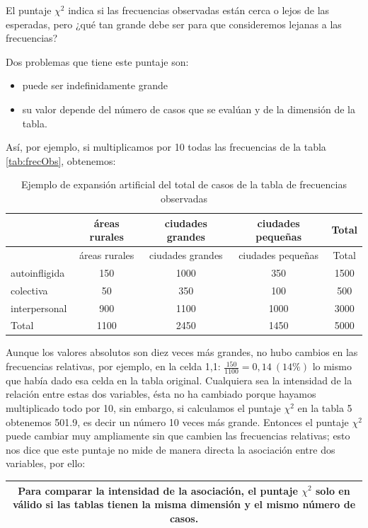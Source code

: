 \documentclass[]{book}
\providecommand{\tightlist}{%
  \setlength{\itemsep}{0pt}\setlength{\parskip}{0pt}}
\begin{document}
El puntaje \(\chi^{2}\) indica si las frecuencias observadas están cerca o lejos de las esperadas, pero ¿qué tan grande debe ser para que consideremos lejanas a las frecuencias?

Dos problemas que tiene este puntaje son:

\begin{itemize}
\tightlist
\item
  puede ser indefinidamente grande
\item
  su valor depende del número de casos que se evalúan y de la dimensión de la tabla.
\end{itemize}

Así, por ejemplo, si multiplicamos por 10 todas las frecuencias de la tabla \ref{tab:frecObs}, obtenemos:

\begin{longtable}[]{@{}lcccc@{}}
\caption{\label{tab:unnamed-chunk-158}Ejemplo de expansión artificial del total de casos de la tabla de frecuencias observadas}\tabularnewline
\toprule
& áreas rurales & ciudades grandes & ciudades pequeñas & Total\tabularnewline
\midrule
\endfirsthead
\toprule
& áreas rurales & ciudades grandes & ciudades pequeñas & Total\tabularnewline
\midrule
\endhead
autoinfligida & 150 & 1000 & 350 & 1500\tabularnewline
colectiva & 50 & 350 & 100 & 500\tabularnewline
interpersonal & 900 & 1100 & 1000 & 3000\tabularnewline
Total & 1100 & 2450 & 1450 & 5000\tabularnewline
\bottomrule
\end{longtable}

Aunque los valores absolutos son diez veces más grandes, no hubo cambios en las frecuencias relativas, por ejemplo, en la celda 1,1: \(\frac{150}{1100} = 0,14\ (14\%)\) lo mismo que había dado esa celda en la tabla original. Cualquiera sea la intensidad de la relación entre estas dos variables, ésta no ha cambiado porque hayamos multiplicado todo por 10, sin embargo, si calculamos el puntaje \(\chi^{2}\) en la tabla 5 obtenemos 501.9, es decir un número 10 veces más grande. Entonces el puntaje \(\chi^{2}\) puede cambiar muy ampliamente sin que cambien las frecuencias relativas; esto nos dice que este puntaje no mide de manera directa la asociación entre dos variables, por ello:

\begin{longtable}[]{@{}c@{}}
\toprule
\endhead
\begin{minipage}[t]{0.97\columnwidth}\centering
Para comparar la intensidad de la asociación, el puntaje \(\chi^{2}\) solo en válido si las tablas tienen la misma dimensión y el mismo número de casos.\strut
\end{minipage}\tabularnewline
\bottomrule
\end{longtable}
\end{document}

